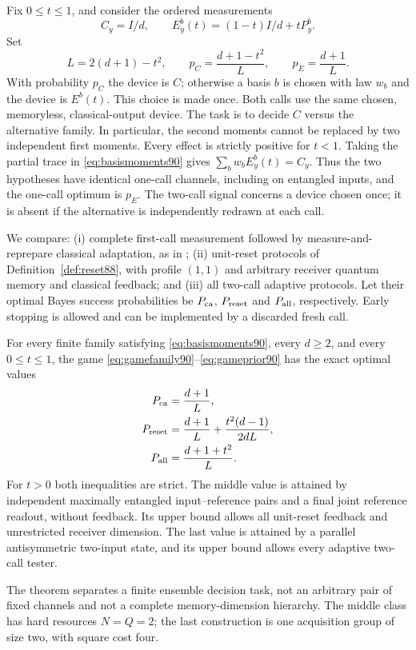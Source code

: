 Fix $0\le t\le1$, and consider the ordered measurements
\begin{equation}\label{eq:gamefamily90}
 C_y=I/d,\qquad E_y^b(t)=(1-t)I/d+tP_y^b.
\end{equation}
Set
\begin{equation}\label{eq:gameprior90}
 L=2(d+1)-t^2,\qquad
 p_C=\frac{d+1-t^2}{L},\qquad p_E=\frac{d+1}{L}.
\end{equation}
With probability $p_C$ the device is $C$; otherwise a basis $b$ is chosen
with law $w_b$ and the device is $E^b(t)$.  This choice is made once.
Both calls use the same chosen, memoryless, classical-output device.
The task is to decide $C$ versus the alternative family.  In particular,
the second moments cannot be replaced by two independent first moments.
Every effect is strictly positive for $t<1$.
Taking the partial trace in \eqref{eq:basismoments90} gives
$\sum_b w_bE_y^b(t)=C_y$.  Thus the two hypotheses have identical
one-call channels, including on entangled inputs, and the one-call
optimum is $p_E$.  The two-call signal concerns a device chosen once;
it is absent if the alternative is independently redrawn at each call.

We compare: (i) complete first-call measurement followed by
measure-and-reprepare classical adaptation, as in
\cite[Definition~23]{OZNPQ89}; (ii) unit-reset protocols of
Definition~\ref{def:reset88}, with profile $(1,1)$ and arbitrary receiver
quantum memory and classical feedback; and (iii) all two-call adaptive
protocols.  Let their optimal Bayes success probabilities be
$P_{\rm ca}$, $P_{\rm reset}$ and $P_{\rm all}$, respectively.
Early stopping is allowed and can be implemented by a discarded fresh call.

\begin{theorem}\label{thm:operationalhierarchy90}
For every finite family satisfying \eqref{eq:basismoments90}, every
$d\ge2$, and every $0\le t\le1$, the game \eqref{eq:gamefamily90}--\eqref{eq:gameprior90}
has the exact optimal values
\begin{equation}\label{eq:operationalhierarchy90}
\begin{split}
 P_{\rm ca}&=\frac{d+1}{L},\\
 P_{\rm reset}&=\frac{d+1}{L}+\frac{t^2(d-1)}{2dL},\\
 P_{\rm all}&=\frac{d+1+t^2}{L}.
\end{split}
\end{equation}
For $t>0$ both inequalities are strict.  The middle value is attained
by independent maximally entangled input--reference pairs and a final
joint reference readout, without feedback.  Its upper bound allows all
unit-reset feedback and unrestricted receiver dimension.  The last
value is attained by a parallel antisymmetric two-input state, and its
upper bound allows every adaptive two-call tester.
\end{theorem}
The theorem separates a finite ensemble decision task, not an arbitrary
pair of fixed channels and not a complete memory-dimension hierarchy.
The middle class has hard resources $N=Q=2$; the last construction is
one acquisition group of size two, with square cost four.

